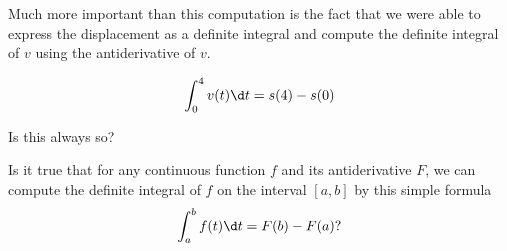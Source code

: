 \documentclass{ximera}
\begin{document}
\begin{example}
Much more important than this computation is the fact that we were able to express the displacement as a definite integral and  compute the definite integral  of $v$ using the antiderivative of $v$.

 \[
   \int_{0}^{4}v(t)\d t=s(4)-s(0)
\]

Is this always so?

Is it true that for any continuous function $f$ and its antiderivative $F$, we can compute the definite integral of $f$ on the interval $[a,b]$ by this simple formula
\[
   \int_{a}^{b}f(t)\d t=F(b)-F(a)?
\]

\end{example}
\end{document}

